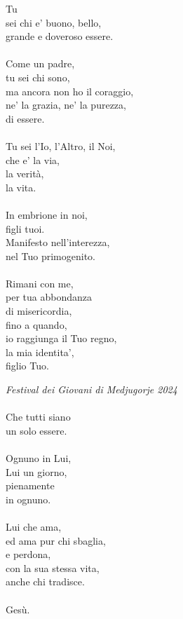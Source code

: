 \begin{haiku}
    Tu\\
    sei chi e' buono, bello,\\
    grande e doveroso essere.\\
    \leavevmode\\
    Come un padre,\\
    tu sei chi sono,\\
    ma ancora non ho il coraggio,\\
    ne' la grazia, ne' la purezza,\\
    di essere.\\
    \leavevmode\\
    Tu sei l'Io, l'Altro, il Noi,\\
    che e' la via,\\
    la verità,\\ 
    la vita.\\
    \leavevmode\\
    In embrione in noi, \\
    figli tuoi.\\
    Manifesto nell'interezza,\\
    nel Tuo primogenito.\\
    \leavevmode\\
    Rimani con me,\\
    per tua abbondanza \\
    di misericordia,\\
    fino a quando,\\
    io raggiunga il Tuo regno,\\
    la mia identita',\\
    figlio Tuo.\\
\end{haiku}


\begin{haiku}
\emph{Festival dei Giovani di Medjugorje 2024}\\
\leavevmode\\
Che tutti siano\\
un solo essere.\\
\leavevmode\\
Ognuno in Lui,\\
Lui un giorno,\\
pienamente\\
in ognuno.\\
\leavevmode\\
Lui che ama,\\
ed ama pur chi sbaglia,\\
e perdona,\\
con la sua stessa vita,\\
anche chi tradisce.\\
\leavevmode\\
Gesù.\\
\end{haiku}

